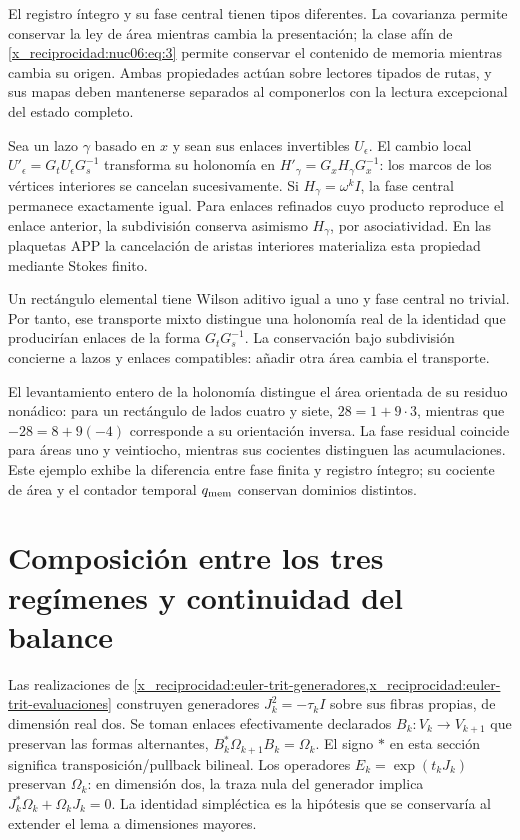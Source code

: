 El registro íntegro y su fase central tienen tipos diferentes. La covarianza permite conservar la ley de área mientras cambia la presentación; la clase afín de \eqref{x_reciprocidad:nuc06:eq:3} permite conservar el contenido de memoria mientras cambia su origen. Ambas propiedades actúan sobre lectores tipados de rutas, y sus mapas deben mantenerse separados al componerlos con la lectura excepcional del estado completo.

\begin{proposition}

Sea un lazo \(\gamma\) basado en \(x\) y sean sus enlaces invertibles \(U_\epsilon\). El cambio local \(U'_\epsilon=G_tU_\epsilon G_s^{-1}\) transforma su holonomía en \(H'_\gamma=G_xH_\gamma G_x^{-1}\): los marcos de los vértices interiores se cancelan sucesivamente. Si \(H_\gamma=\omega^kI\), la fase central permanece exactamente igual. Para enlaces refinados cuyo producto reproduce el enlace anterior, la subdivisión conserva asimismo \(H_\gamma\), por asociatividad. En las plaquetas APP la cancelación de aristas interiores materializa esta propiedad mediante Stokes finito.
\end{proposition}

Un rectángulo elemental tiene Wilson aditivo igual a uno y fase central no trivial. Por tanto, ese transporte mixto distingue una holonomía real de la identidad que producirían enlaces de la forma \(G_tG_s^{-1}\). La conservación bajo subdivisión concierne a lazos y enlaces compatibles: añadir otra área cambia el transporte.

El levantamiento entero de la holonomía distingue el área orientada de su residuo nonádico: para un rectángulo de lados cuatro y siete, \(28=1+9\cdot3\), mientras que \(-28=8+9(-4)\) corresponde a su orientación inversa. La fase residual coincide para áreas uno y veintiocho, mientras sus cocientes distinguen las acumulaciones. Este ejemplo exhibe la diferencia entre fase finita y registro íntegro; su cociente de área y el contador temporal \(q_{\rm mem}\) conservan dominios distintos.

\section{Composición entre los tres regímenes y continuidad del balance}

Las realizaciones de \cref{x_reciprocidad:euler-trit-generadores,x_reciprocidad:euler-trit-evaluaciones} construyen generadores \(J_k^2=-\tau_kI\) sobre sus fibras propias, de dimensión real dos. Se toman enlaces efectivamente declarados \(B_k:V_k\to V_{k+1}\) que preservan las formas alternantes, \(B_k^*\Omega_{k+1}B_k=\Omega_k\). El signo \(*\) en esta sección significa transposición/pullback bilineal. Los operadores \(E_k=\exp(t_kJ_k)\) preservan \(\Omega_k\): en dimensión dos, la traza nula del generador implica \(J_k^*\Omega_k+\Omega_kJ_k=0\). La identidad simpléctica es la hipótesis que se conservaría al extender el lema a dimensiones mayores.

